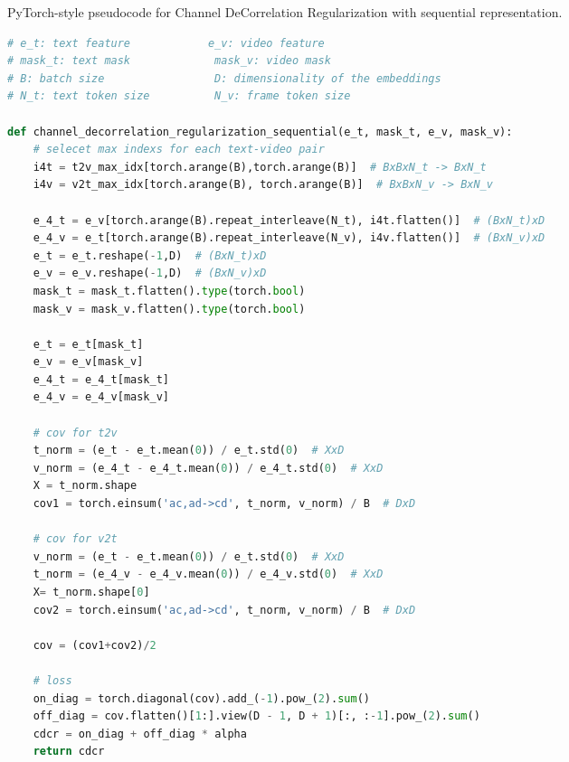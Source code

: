 \documentclass[runningheads]{llncs}
\begin{document}
\begin{algorithm}[tb]
\caption{PyTorch-style pseudocode for Channel DeCorrelation Regularization with sequential representation.}
\label{alg:cdcr2}
   
\begin{lstlisting}[language=python]
# e_t: text feature            e_v: video feature
# mask_t: text mask             mask_v: video mask
# B: batch size                 D: dimensionality of the embeddings
# N_t: text token size          N_v: frame token size

def channel_decorrelation_regularization_sequential(e_t, mask_t, e_v, mask_v): 
    # selecet max indexs for each text-video pair
    i4t = t2v_max_idx[torch.arange(B),torch.arange(B)]  # BxBxN_t -> BxN_t 
    i4v = v2t_max_idx[torch.arange(B), torch.arange(B)]  # BxBxN_v -> BxN_v
    
    e_4_t = e_v[torch.arange(B).repeat_interleave(N_t), i4t.flatten()]  # (BxN_t)xD
    e_4_v = e_t[torch.arange(B).repeat_interleave(N_v), i4v.flatten()]  # (BxN_v)xD
    e_t = e_t.reshape(-1,D)  # (BxN_t)xD
    e_v = e_v.reshape(-1,D)  # (BxN_v)xD
    mask_t = mask_t.flatten().type(torch.bool)
    mask_v = mask_v.flatten().type(torch.bool)
    
    e_t = e_t[mask_t]
    e_v = e_v[mask_v]
    e_4_t = e_4_t[mask_t]
    e_4_v = e_4_v[mask_v]
    
    # cov for t2v
    t_norm = (e_t - e_t.mean(0)) / e_t.std(0)  # XxD
    v_norm = (e_4_t - e_4_t.mean(0)) / e_4_t.std(0)  # XxD
    X = t_norm.shape
    cov1 = torch.einsum('ac,ad->cd', t_norm, v_norm) / B  # DxD
    
    # cov for v2t
    v_norm = (e_t - e_t.mean(0)) / e_t.std(0)  # XxD
    t_norm = (e_4_v - e_4_v.mean(0)) / e_4_v.std(0)  # XxD
    X= t_norm.shape[0]
    cov2 = torch.einsum('ac,ad->cd', t_norm, v_norm) / B  # DxD
    
    cov = (cov1+cov2)/2
    
    # loss
    on_diag = torch.diagonal(cov).add_(-1).pow_(2).sum()
    off_diag = cov.flatten()[1:].view(D - 1, D + 1)[:, :-1].pow_(2).sum()
    cdcr = on_diag + off_diag * alpha
    return cdcr
\end{lstlisting}
\end{algorithm}
\end{document}
